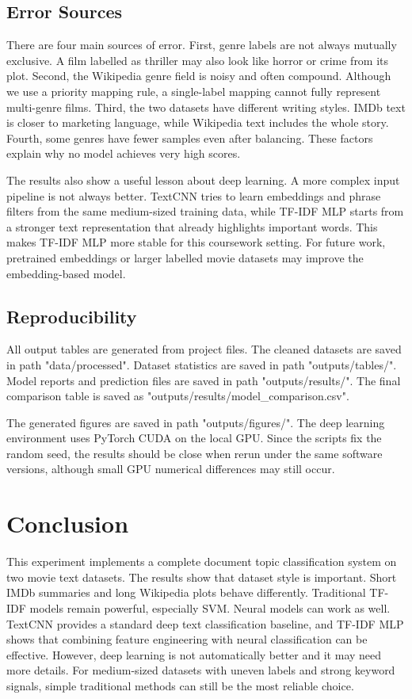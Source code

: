 \documentclass[12pt,a4paper]{article}
\begin{document}
\subsection{Error Sources}
There are four main sources of error. First, genre labels are not always mutually exclusive. A film labelled as thriller may also look like horror or crime from its plot. Second, the Wikipedia genre field is noisy and often compound. Although we use a priority mapping rule, a single-label mapping cannot fully represent multi-genre films. Third, the two datasets have different writing styles. IMDb text is closer to marketing language, while Wikipedia text includes the whole story. Fourth, some genres have fewer samples even after balancing. These factors explain why no model achieves very high scores.

The results also show a useful lesson about deep learning. A more complex input pipeline is not always better. TextCNN tries to learn embeddings and phrase filters from the same medium-sized training data, while TF-IDF MLP starts from a stronger text representation that already highlights important words. This makes TF-IDF MLP more stable for this coursework setting. For future work, pretrained embeddings or larger labelled movie datasets may improve the embedding-based model.

\subsection{Reproducibility}
All output tables are generated from project files. The cleaned datasets are saved in path "data/processed". Dataset statistics are saved in path "outputs/tables/". Model reports and prediction files are saved in path "outputs/results/". The final comparison table is saved as "outputs/results/model\_comparison.csv".

The generated figures are saved in path "outputs/figures/". The deep learning environment uses PyTorch CUDA on the local GPU. Since the scripts fix the random seed, the results should be close when rerun under the same software versions, although small GPU numerical differences may still occur.

\section{Conclusion}
This experiment implements a complete document topic classification system on two movie text datasets. The results show that dataset style is important. Short IMDb summaries and long Wikipedia plots behave differently. Traditional TF-IDF models remain powerful, especially SVM. Neural models can work as well. TextCNN provides a standard deep text classification baseline, and TF-IDF MLP shows that combining feature engineering with neural classification can be effective. However, deep learning is not automatically better and it may need more details. For medium-sized datasets with uneven labels and strong keyword signals, simple traditional methods can still be the most reliable choice.

\newpage
\printbibliography
\end{document}
